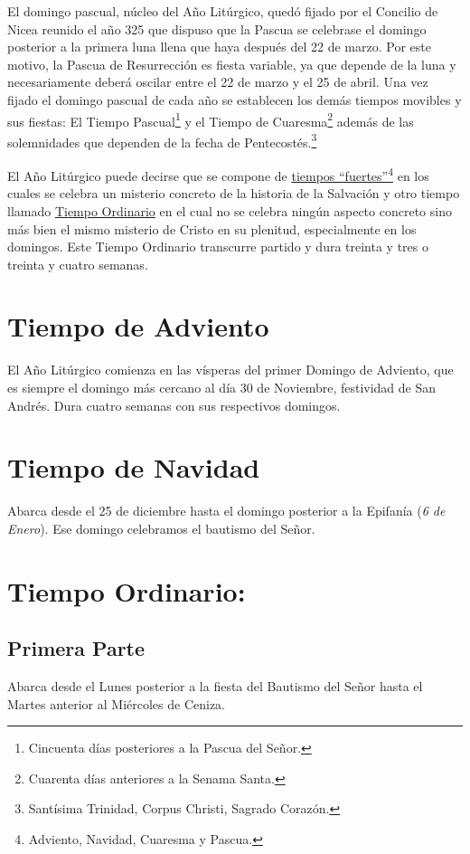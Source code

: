 \documentclass[letterpaper, 12pt]{book}
\begin{document}
    El domingo pascual, n\'ucleo del A\~no Lit\'urgico, qued\'o fijado por el Concilio de Nicea reunido el a\~no 325 que dispuso que la Pascua se celebrase el domingo posterior a la primera luna llena que haya despu\'es del 22 de marzo. Por este motivo, la Pascua de Resurrecci\'on es fiesta variable, ya que depende de la luna y necesariamente deber\'a oscilar entre el 22 de marzo y el 25 de abril. Una vez fijado el domingo pascual de cada a\~no se establecen los dem\'as tiempos movibles y sus fiestas: El Tiempo Pascual\footnote{Cincuenta d\'ias posteriores a la Pascua del Se\~nor.} y el Tiempo de Cuaresma\footnote{Cuarenta d\'ias anteriores a la Senama Santa.} adem\'as de las solemnidades que dependen de la fecha de Pentecost\'es.\footnote{Sant\'isima Trinidad, Corpus Christi, Sagrado Coraz\'on.}\newline
    
    El A\~no Lit\'urgico puede decirse que se compone de \underline{tiempos ``fuertes''}\footnote{Adviento, Navidad, Cuaresma y Pascua.} en los cuales se celebra un misterio concreto de la historia de la Salvaci\'on y otro tiempo llamado \underline{Tiempo Ordinario} en el cual no se celebra ning\'un aspecto concreto sino m\'as bien el mismo misterio de Cristo en su plenitud, especialmente en los domingos. Este Tiempo Ordinario transcurre partido y dura treinta y tres o treinta y cuatro semanas.
    
    \section{Tiempo de Adviento}
    El A\~no Lit\'urgico comienza en las v\'isperas del primer Domingo de Adviento, que es siempre el domingo m\'as cercano al d\'ia 30 de Noviembre, festividad de San Andr\'es. Dura cuatro semanas con sus respectivos domingos.
    
    \section{Tiempo de Navidad}
    Abarca desde el 25 de diciembre hasta el domingo posterior a la Epifan\'ia (\textit{6 de Enero}). Ese domingo celebramos el bautismo del Se\~nor.
    
    \section{Tiempo Ordinario:}
        \subsection{Primera Parte}
        Abarca desde el Lunes posterior a la fiesta del Bautismo del Se\~nor hasta el Martes anterior al Mi\'ercoles de Ceniza.
        
\end{document}
